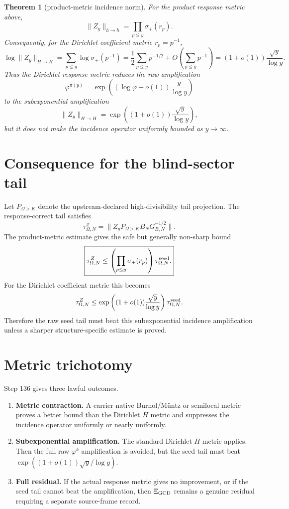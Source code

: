 \documentclass[11pt]{article}
\newtheorem{theorem}{Theorem}
\begin{document}
\begin{theorem}[product-metric incidence norm]
For the product response metric above,
\[
\boxed{
\|Z_y\|_{h\to h}=
\prod_{p\le y}\sigma_+(r_p).
}
\]
Consequently, for the Dirichlet coefficient metric $r_p=p^{-1}$,
\[
\log \|Z_y\|_{H\to H}
=
\sum_{p\le y}\log\sigma_+(p^{-1})
=
\frac12\sum_{p\le y}p^{-1/2}+O\left(\sum_{p\le y}p^{-1}\right)
=
(1+o(1))\frac{\sqrt y}{\log y}.
\]
Thus the Dirichlet response metric reduces the raw amplification
\[
\varphi^{\pi(y)}=\exp\left((\log\varphi+o(1))\frac{y}{\log y}\right)
\]
to the subexponential amplification
\[
\boxed{
\|Z_y\|_{H\to H}
=
\exp\left((1+o(1))\frac{\sqrt y}{\log y}\right),
}
\]
but it does not make the incidence operator uniformly bounded as $y\to\infty$.
\end{theorem}

\section{Consequence for the blind-sector tail}
Let $P_{\Omega>K}$ denote the upstream-declared high-divisibility tail projection.  The response-correct tail satisfies
\[
\tau_{\Omega,N}^{Z}
=
\|Z_yP_{\Omega>K}B_NG_{B,N}^{-1/2}\|.
\]
The product-metric estimate gives the safe but generally non-sharp bound
\[
\boxed{
\tau_{\Omega,N}^{Z}
\le
\left(\prod_{p\le y}\sigma_+(r_p)\right)
\tau_{\Omega,N}^{\rm seed}.
}
\]
For the Dirichlet coefficient metric this becomes
\[
\tau_{\Omega,N}^{Z}
\le
\exp\left((1+o(1))\frac{\sqrt y}{\log y}\right)
\tau_{\Omega,N}^{\rm seed}.
\]
Therefore the raw seed tail must beat this subexponential incidence amplification unless a sharper structure-specific estimate is proved.

\section{Metric trichotomy}
Step 136 gives three lawful outcomes.
\begin{enumerate}
\item \textbf{Metric contraction.}  A carrier-native Burnol/Müntz or semilocal metric proves a better bound than the Dirichlet $H$ metric and suppresses the incidence operator uniformly or nearly uniformly.
\item \textbf{Subexponential amplification.}  The standard Dirichlet $H$ metric applies.  Then the full raw $\varphi^k$ amplification is avoided, but the seed tail must beat $\exp((1+o(1))\sqrt y/\log y)$.
\item \textbf{Full residual.}  If the actual response metric gives no improvement, or if the seed tail cannot beat the amplification, then $\Xi_{\rm GCD}$ remains a genuine residual requiring a separate source-frame record.
\end{enumerate}
\end{document}
